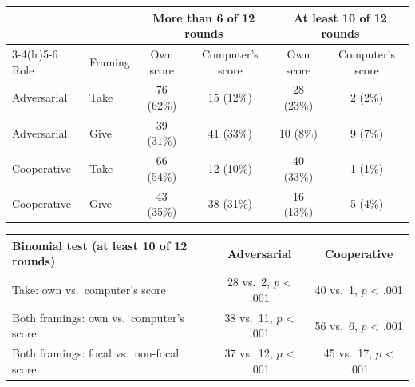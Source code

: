 \begingroup
\centering
\begin{tabular*}{\linewidth}{@{\extracolsep{\fill}}llcccc}
   \toprule
   & & \multicolumn{2}{c}{More than 6 of 12 rounds} & \multicolumn{2}{c}{At least 10 of 12 rounds}\\
   \cmidrule(lr){3-4}\cmidrule(lr){5-6}
   Role & Framing & Own score & Computer's score & Own score & Computer's score\\
   \midrule
   Adversarial & Take & 76 (62\%) & 15 (12\%) & 28 (23\%) & 2 (2\%)\\
   Adversarial & Give & 39 (31\%) & 41 (33\%) & 10 (8\%) & 9 (7\%)\\
   Cooperative & Take & 66 (54\%) & 12 (10\%) & 40 (33\%) & 1 (1\%)\\
   Cooperative & Give & 43 (35\%) & 38 (31\%) & 16 (13\%) & 5 (4\%)\\
   \bottomrule
\end{tabular*}
\par\medskip
\begin{tabular*}{\linewidth}{@{\extracolsep{\fill}}lcc}
   \toprule
   Binomial test (at least 10 of 12 rounds) & Adversarial & Cooperative\\
   \midrule
   Take: own vs.\ computer's score & 28 vs.\ 2, $p$ < .001 & 40 vs.\ 1, $p$ < .001\\
   Both framings: own vs.\ computer's score & 38 vs.\ 11, $p$ < .001 & 56 vs.\ 6, $p$ < .001\\
   Both framings: focal vs.\ non-focal score & 37 vs.\ 12, $p$ < .001 & 45 vs.\ 17, $p$ < .001\\
   \bottomrule
\end{tabular*}
\par\endgroup
